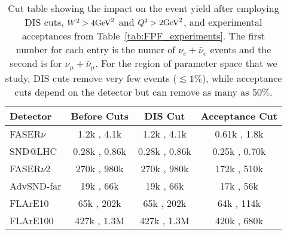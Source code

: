 \begin{table}[t]
  \centering
  \small
  \renewcommand{\arraystretch}{1.70}
  \begin{tabularx}{0.8\textwidth}{p{}|c|c|c}
    \toprule
    Detector & Before Cuts & DIS Cut & Acceptance Cut \\
    \midrule
    \midrule
    FASER$\nu$ & 1.2k , 4.1k & 1.2k , 4.1k & 0.61k , 1.8k \\
    SND@LHC & 0.28k , 0.86k & 0.28k , 0.86k & 0.25k , 0.70k \\
    \midrule
    \midrule
    FASER$\nu$2 & 270k , 980k & 270k , 980k  & 172k , 510k \\
    AdvSND-far & 19k , 66k & 19k , 66k & 17k , 56k\\
    FLArE10 & 65k , 202k & 65k , 202k  & 64k , 114k \\
    FLArE100 & 427k , 1.3M &427k , 1.3M  & 420k , 680k \\
    \bottomrule
  \end{tabularx}
  \vspace{0.2cm}
\caption{Cut table showing the impact on the event yield after employing DIS cuts, $W^2 > 4{\rm GeV}^2$ and $Q^2 > 2{\rm GeV}^2$, and experimental acceptances from Table~\ref{tab:FPF_experiments}. The first number for each entry is the numer of $\nu_e + \bar{\nu}_e$ events and the second is for $\nu_{\mu} + \bar{\nu}_{\mu}$.  For the region of parameter space that we study, DIS cuts remove very few events ($\lesssim 1\%$), while acceptance cuts depend on the detector but can remove as many as 50$\%$.}
\label{tab:acceptance}
\end{table}
